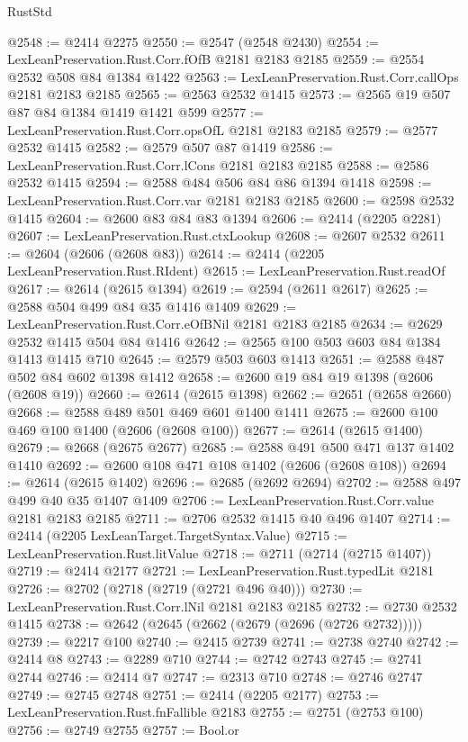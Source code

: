 \begin{lexlean}{RustStd}
\begin{coremodule}
@2548 := @2414 @2275
@2550 := @2547 (@2548 @2430)
@2554 := LexLeanPreservation.Rust.Corr.fOfB @2181 @2183 @2185
@2559 := @2554 @2532 @508 @84 @1384 @1422
@2563 := LexLeanPreservation.Rust.Corr.callOps @2181 @2183 @2185
@2565 := @2563 @2532 @1415
@2573 := @2565 @19 @507 @87 @84 @1384 @1419 @1421 @599
@2577 := LexLeanPreservation.Rust.Corr.opsOfL @2181 @2183 @2185
@2579 := @2577 @2532 @1415
@2582 := @2579 @507 @87 @1419
@2586 := LexLeanPreservation.Rust.Corr.lCons @2181 @2183 @2185
@2588 := @2586 @2532 @1415
@2594 := @2588 @484 @506 @84 @86 @1394 @1418
@2598 := LexLeanPreservation.Rust.Corr.var @2181 @2183 @2185
@2600 := @2598 @2532 @1415
@2604 := @2600 @83 @84 @83 @1394
@2606 := @2414 (@2205 @2281)
@2607 := LexLeanPreservation.Rust.ctxLookup
@2608 := @2607 @2532
@2611 := @2604 (@2606 (@2608 @83))
@2614 := @2414 (@2205 LexLeanPreservation.Rust.RIdent)
@2615 := LexLeanPreservation.Rust.readOf
@2617 := @2614 (@2615 @1394)
@2619 := @2594 (@2611 @2617)
@2625 := @2588 @504 @499 @84 @35 @1416 @1409
@2629 := LexLeanPreservation.Rust.Corr.eOfBNil @2181 @2183 @2185
@2634 := @2629 @2532 @1415 @504 @84 @1416
@2642 := @2565 @100 @503 @603 @84 @1384 @1413 @1415 @710
@2645 := @2579 @503 @603 @1413
@2651 := @2588 @487 @502 @84 @602 @1398 @1412
@2658 := @2600 @19 @84 @19 @1398 (@2606 (@2608 @19))
@2660 := @2614 (@2615 @1398)
@2662 := @2651 (@2658 @2660)
@2668 := @2588 @489 @501 @469 @601 @1400 @1411
@2675 := @2600 @100 @469 @100 @1400 (@2606 (@2608 @100))
@2677 := @2614 (@2615 @1400)
@2679 := @2668 (@2675 @2677)
@2685 := @2588 @491 @500 @471 @137 @1402 @1410
@2692 := @2600 @108 @471 @108 @1402 (@2606 (@2608 @108))
@2694 := @2614 (@2615 @1402)
@2696 := @2685 (@2692 @2694)
@2702 := @2588 @497 @499 @40 @35 @1407 @1409
@2706 := LexLeanPreservation.Rust.Corr.value @2181 @2183 @2185
@2711 := @2706 @2532 @1415 @40 @496 @1407
@2714 := @2414 (@2205 LexLeanTarget.TargetSyntax.Value)
@2715 := LexLeanPreservation.Rust.litValue
@2718 := @2711 (@2714 (@2715 @1407))
@2719 := @2414 @2177
@2721 := LexLeanPreservation.Rust.typedLit @2181
@2726 := @2702 (@2718 (@2719 (@2721 @496 @40)))
@2730 := LexLeanPreservation.Rust.Corr.lNil @2181 @2183 @2185
@2732 := @2730 @2532 @1415
@2738 := @2642 (@2645 (@2662 (@2679 (@2696 (@2726 @2732)))))
@2739 := @2217 @100
@2740 := @2415 @2739
@2741 := @2738 @2740
@2742 := @2414 @8
@2743 := @2289 @710
@2744 := @2742 @2743
@2745 := @2741 @2744
@2746 := @2414 @7
@2747 := @2313 @710
@2748 := @2746 @2747
@2749 := @2745 @2748
@2751 := @2414 (@2205 @2177)
@2753 := LexLeanPreservation.Rust.fnFallible @2183
@2755 := @2751 (@2753 @100)
@2756 := @2749 @2755
@2757 := Bool.or

\end{coremodule}
\end{lexlean}
